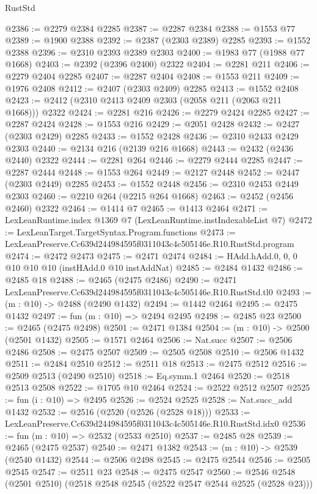 \begin{lexlean}{RustStd}
\begin{coremodule}
@2386 := @2279 @2384 @2285
@2387 := @2287 @2384
@2388 := @1553 @77
@2389 := @1900 @2388
@2392 := @2387 (@2303 @2389) @2285
@2393 := @1552 @2388
@2396 := @2310 @2393 @2389 @2303
@2400 := @1983 @77 (@1988 @77 @1668)
@2403 := @2392 (@2396 @2400) @2322
@2404 := @2281 @211
@2406 := @2279 @2404 @2285
@2407 := @2287 @2404
@2408 := @1553 @211
@2409 := @1976 @2408
@2412 := @2407 (@2303 @2409) @2285
@2413 := @1552 @2408
@2423 := @2412 (@2310 @2413 @2409 @2303 (@2058 @211 (@2063 @211 @1668))) @2322
@2424 := @2281 @216
@2426 := @2279 @2424 @2285
@2427 := @2287 @2424
@2428 := @1553 @216
@2429 := @2051 @2428
@2432 := @2427 (@2303 @2429) @2285
@2433 := @1552 @2428
@2436 := @2310 @2433 @2429 @2303
@2440 := @2134 @216 (@2139 @216 @1668)
@2443 := @2432 (@2436 @2440) @2322
@2444 := @2281 @264
@2446 := @2279 @2444 @2285
@2447 := @2287 @2444
@2448 := @1553 @264
@2449 := @2127 @2448
@2452 := @2447 (@2303 @2449) @2285
@2453 := @1552 @2448
@2456 := @2310 @2453 @2449 @2303
@2460 := @2210 @264 (@2215 @264 @1668)
@2463 := @2452 (@2456 @2460) @2322
@2464 := @1414 @7
@2465 := @1413 @2464
@2471 := LexLeanRuntime.index @1369 @7 (LexLeanRuntime.instIndexableList @7)
@2472 := LexLeanTarget.TargetSyntax.Program.functions
@2473 := LexLeanPreserve.Cc639d244984595f0311043c4c505146e.R10.RustStd.program
@2474 := @2472 @2473
@2475 := @2471 @2474
@2484 := HAdd.hAdd.{0, 0, 0} @10 @10 @10 (instHAdd.{0} @10 instAddNat)
@2485 := @2484 @1432
@2486 := @2485 @18
@2488 := @2465 (@2475 @2486)
@2490 := @2471 LexLeanPreserve.Cc639d244984595f0311043c4c505146e.R10.RustStd.tl0
@2493 := (m : @10) -> @2488 (@2490 @1432)
@2494 := @1442 @2464
@2495 := @2475 @1432
@2497 := fun (m : @10) => @2494 @2495
@2498 := @2485 @23
@2500 := @2465 (@2475 @2498)
@2501 := @2471 @1384
@2504 := (m : @10) -> @2500 (@2501 @1432)
@2505 := @1571 @2464
@2506 := Nat.succ
@2507 := @2506 @2486
@2508 := @2475 @2507
@2509 := @2505 @2508
@2510 := @2506 @1432
@2511 := @2484 @2510
@2512 := @2511 @18
@2513 := @2475 @2512
@2516 := @2509 @2513 (@2490 @2510)
@2518 := Eq.symm.{1} @2464
@2520 := @2518 @2513 @2508
@2522 := @1705 @10 @2464
@2524 := @2522 @2512 @2507
@2525 := fun (i : @10) => @2495
@2526 := @2524 @2525
@2528 := Nat.succ_add @1432
@2532 := @2516 (@2520 (@2526 (@2528 @18)))
@2533 := LexLeanPreserve.Cc639d244984595f0311043c4c505146e.R10.RustStd.idx0
@2536 := fun (m : @10) => @2532 (@2533 @2510)
@2537 := @2485 @28
@2539 := @2465 (@2475 @2537)
@2540 := @2471 @1382
@2543 := (m : @10) -> @2539 (@2540 @1432)
@2544 := @2506 @2498
@2545 := @2475 @2544
@2546 := @2505 @2545
@2547 := @2511 @23
@2548 := @2475 @2547
@2560 := @2546 @2548 (@2501 @2510) (@2518 @2548 @2545 (@2522 @2547 @2544 @2525 (@2528 @23)))

\end{coremodule}
\end{lexlean}
